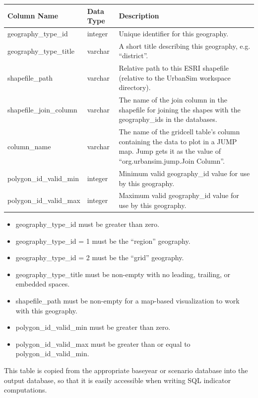 \begin{tabular}{|l|l|p{4.5in}|}
\hline
\textbf{Column Name} & \textbf{Data Type} & \textbf{Description} \\
\hline
geography_type_id & integer & Unique identifier for this geography.  \\
\hline
geography_type_title & varchar & A short title describing this geography, e.g. ``district''.  \\
\hline
shapefile_path & varchar &  Relative path to this ESRI shapefile (relative to the UrbanSim workspace directory).   \\
\hline
shapefile_join_column & varchar &  The name of the join column in the shapefile for joining the shapes with the geography_ids in the databases.  \\
\hline
column_name & varchar &  The name of the gridcell table's column containing the data to plot in a JUMP map. Jump gets it as the value of ``org.urbansim.jump.Join Column''.  \\
\hline
polygon_id_valid_min & integer & Minimum valid geography_id value for use by this geography.  \\
\hline
polygon_id_valid_max & integer & Maximum valid geography_id value for use by this geography.  \\
\hline

\end{tabular}

\begin{itemize} \tight
\item geography_type_id must be greater than zero.
\item geography_type_id = 1 must be the ``region'' geography.
\item geography_type_id = 2 must be the ``grid'' geography.
\item geography_type_title must be non-empty with no leading, trailing, or
embedded spaces.
\item shapefile_path must be non-empty for a map-based visualization to work
with this geography.
\item polygon_id_valid_min must be greater than zero.
\item polygon_id_valid_max must be greater than or equal to
polygon_id_valid_min.
\end{itemize}

This table is copied from the appropriate baseyear or scenario database into
the output database, so that it is easily accessible when writing SQL indicator
computations.  \\ \\
